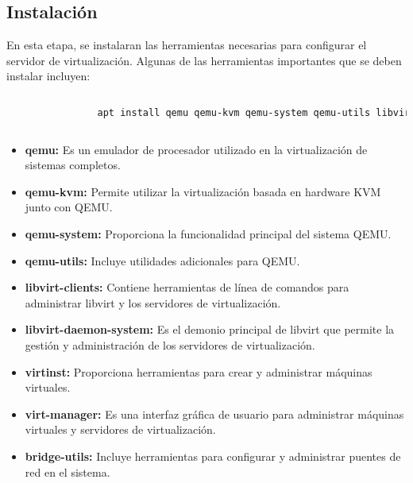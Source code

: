 				
			\subsection{Instalación}\label{instalación de las herramientas}
		
				En esta etapa, se instalaran las herramientas necesarias para configurar el servidor de virtualización. Algunas de las herramientas importantes que se deben instalar incluyen:
	
				\begin{lstlisting}[language=Bash, caption=instalación de las herramientas]
			
				apt install qemu qemu-kvm qemu-system qemu-utils libvirt-clients libvirt-daemon-system virtinst virt-manager bridge-utils		
				
				\end{lstlisting}		
			
				\begin{itemize}
			
					\item\textbf{qemu:} Es un emulador de procesador utilizado en la virtualización de sistemas completos.
	
					\item\textbf{qemu-kvm:} Permite utilizar la virtualización basada en hardware KVM junto con QEMU.
	
					\item\textbf{qemu-system:} Proporciona la funcionalidad principal del sistema QEMU.
	
					\item\textbf{qemu-utils:} Incluye utilidades adicionales para QEMU.
	
					\item\textbf{libvirt-clients:} Contiene herramientas de línea de comandos para administrar libvirt y los servidores de virtualización.
	
					\item\textbf{libvirt-daemon-system:} Es el demonio principal de libvirt que permite la gestión y administración de los servidores de virtualización.
	
					\item\textbf{virtinst:} Proporciona herramientas para crear y administrar máquinas virtuales.
	
					\item\textbf{virt-manager:} Es una interfaz gráfica de usuario para administrar máquinas virtuales y servidores de virtualización.
	
					\item\textbf{bridge-utils:} Incluye herramientas para configurar y administrar puentes de red en el sistema.
				
			\end{itemize}		
		

